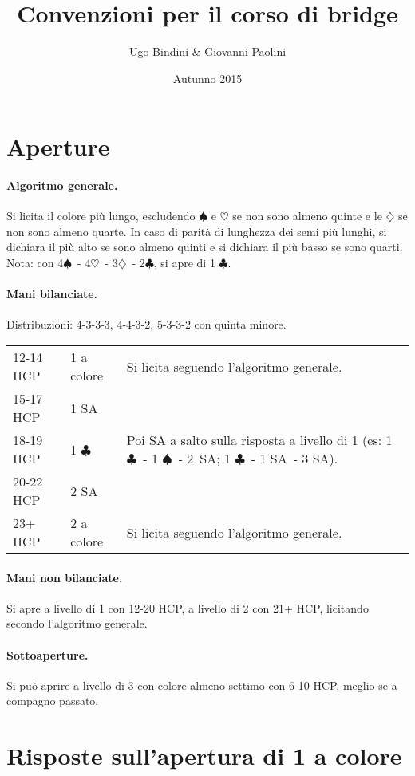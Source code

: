 \documentclass[a4paper,10pt]{article}
\title{Convenzioni per il corso di bridge}
\author{Ugo Bindini \& Giovanni Paolini}
\date{Autunno 2015}
\renewcommand{\c}{$\clubsuit$\xspace}
\renewcommand{\d}{$\diamondsuit$\xspace}
\newcommand{\h}{$\heartsuit$\xspace}
\newcommand{\s}{$\spadesuit$\xspace}
\newcommand{\sa}{SA\xspace}
\newcommand{\smallspace}{\vskip0.3cm}
\newenvironment{threecol}
  {\smallspace\noindent\begin{tabular}{l l p{0.78\textwidth}}}
  {\end{tabular}\smallspace}
\begin{document}
\maketitle

\section{Aperture}

\paragraph{Algoritmo generale.}
Si licita il colore più lungo, escludendo \s e \h se non sono almeno quinte e le \d se non sono almeno quarte.
In caso di parità di lunghezza dei semi più lunghi, si dichiara il più alto se sono almeno quinti e si dichiara il più basso se sono quarti.
Nota: con 4\s\ - 4\h\ - 3\d\ - 2\c, si apre di 1 \c.

\paragraph{Mani bilanciate.} Distribuzioni: 4-3-3-3, 4-4-3-2, 5-3-3-2 con quinta minore.

\begin{threecol}
 12-14 HCP & 1 a colore & Si licita seguendo l'algoritmo generale.\\
 15-17 HCP & 1 \sa\\
 18-19 HCP & 1 \c & Poi \sa a salto sulla risposta a livello di 1 (es: 1 \c\ - 1 \s\ - \mbox{2 \sa}; 1 \c\ - 1 \sa\ - 3 \sa).\\
 20-22 HCP & 2 \sa\\
 23+ HCP & 2 a colore & Si licita seguendo l'algoritmo generale.
\end{threecol}

\paragraph{Mani non bilanciate.} Si apre a livello di 1 con 12-20 HCP, a livello di 2 con 21+ HCP, licitando secondo l'algoritmo generale.

\paragraph{Sottoaperture.} Si può aprire a livello di 3 con colore almeno settimo con 6-10 HCP, meglio se a compagno passato.


\section{Risposte sull'apertura di 1 a colore}
\end{document}
